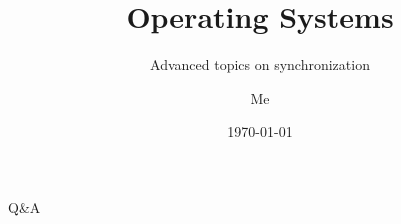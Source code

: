 \documentclass[12pt]{beamer}
\title{Operating Systems}
\subtitle{Advanced topics on synchronization}
\author{Me}
\date{\today}
\begin{document}
  \begin{frame}
    \titlepage
  \end{frame}

  
  

  \begin{frame}
  \begin{center}
  \Huge Q\&A
  \end{center}
  \end{frame}
\end{document}
